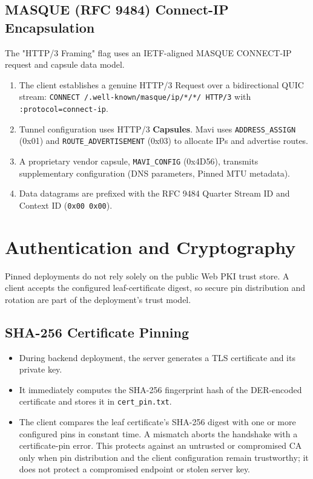 \documentclass[11pt,a4paper]{article}
\begin{document}
\subsection{MASQUE (RFC 9484) Connect-IP Encapsulation}
The "HTTP/3 Framing" flag uses an IETF-aligned MASQUE CONNECT-IP request and capsule data model.
\begin{enumerate}
    \item The client establishes a genuine HTTP/3 Request over a bidirectional QUIC stream: 
    \texttt{CONNECT /.well-known/masque/ip/*/*/ HTTP/3} with \texttt{:protocol=connect-ip}.
    \item Tunnel configuration uses HTTP/3 \textbf{Capsules}. Mavi uses \texttt{ADDRESS\_ASSIGN} (0x01) and \texttt{ROUTE\_ADVERTISEMENT} (0x03) to allocate IPs and advertise routes.
    \item A proprietary vendor capsule, \texttt{MAVI\_CONFIG} (0x4D56), transmits supplementary configuration (DNS parameters, Pinned MTU metadata).
    \item Data datagrams are prefixed with the RFC 9484 Quarter Stream ID and Context ID (\texttt{0x00 0x00}).
\end{enumerate}

\section{Authentication and Cryptography}

Pinned deployments do not rely solely on the public Web PKI trust store. A client accepts the configured leaf-certificate digest, so secure pin distribution and rotation are part of the deployment's trust model.

\subsection{SHA-256 Certificate Pinning}
\begin{itemize}
    \item During backend deployment, the server generates a TLS certificate and its private key.
    \item It immediately computes the SHA-256 fingerprint hash of the DER-encoded certificate and stores it in \texttt{cert\_pin.txt}.
    \item The client compares the leaf certificate's SHA-256 digest with one or more configured pins in constant time. A mismatch aborts the handshake with a certificate-pin error. This protects against an untrusted or compromised CA only when pin distribution and the client configuration remain trustworthy; it does not protect a compromised endpoint or stolen server key.
\end{itemize}
\end{document}
